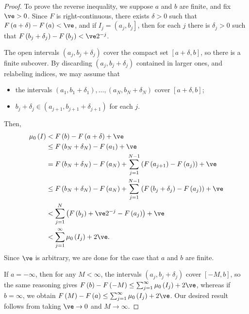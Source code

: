 \documentclass[10pt]{mypackage}
\begin{document}
\begin{proof}
  To prove the reverse inequality, we suppose $a$ and $b$ are finite, and fix $\ve > 0$. Since $F$ is right-continuous, there exists $\delta > 0$ such that $F\left( a+\delta \right)-F\left( a \right) < \ve$, and if $I_j = \left( a_j,b_j \right]$, then for each $j$ there is $\delta_j > 0$ such that $F\left( b_j + \delta_j \right) - F\left( b_j \right) < \ve 2^{-j}$.\newline

  The open intervals $\left( a_j,b_j + \delta_j \right)$ cover the compact set $\left[ a+\delta,b \right]$, so there is a finite subcover. By discarding $\left( a_j,b_j + \delta_j \right)$ contained in larger ones, and relabeling indices, we may assume that
  \begin{itemize}
    \item the intervals $\left( a_1,b_1+\delta_1 \right),\dots,\left( a_N,b_N + \delta_N \right)$ cover $\left[ a+\delta,b \right]$;
    \item $b_j + \delta_j\in \left( a_{j+1},b_{j+1} + \delta_{j+1} \right)$ for each $j$.
  \end{itemize}
  Then,
  \begin{align*}
    \mu_0\left( I \right) &< F\left( b \right) - F\left( a + \delta \right) + \ve\\
                          &\leq F\left( b_N + \delta_N \right) - F\left( a_1 \right) + \ve\\
                          &= F\left( b_N + \delta_N \right) - F\left( a_N \right) + \sum_{j=1}^{N-1}\left( F\left( a_{j+1} \right)-F\left( a_j \right) \right) + \ve\\
                          &\leq F\left( b_N + \delta_N \right) - F\left( a_N \right) + \sum_{j=1}^{N-1}\left( F\left( b_j + \delta_j \right) - F\left( a_j \right) \right) + \ve\\
                          &< \sum_{j=1}^{N} \left( F\left( b_j \right) + \ve 2^{-j} - F\left( a_j \right) \right) + \ve\\
                          &< \sum_{j=1}^{\infty}\mu_0\left( I_j \right) + 2\ve.
  \end{align*}
  Since $\ve$ is arbitrary, we are done for the case that $a$ and $b$ are finite.\newline

  If $a = -\infty$, then for any $M < \infty$, the intervals $\left( a_j,b_j + \delta_j \right)$ cover $\left[ -M,b \right]$, so the same reasoning gives $F\left( b \right) - F\left( -M \right) \leq \sum_{j=1}^{\infty}\mu_0\left( I_j \right) + 2\ve$, whereas if $b = \infty$, we obtain $F\left( M \right) - F\left( a \right) \leq \sum_{j=1}^{\infty}\mu_0\left( I_j \right) + 2\ve$. Our desired result follows from taking $\ve\rightarrow 0$ and $M\rightarrow \infty$.
\end{proof}
\end{document}
